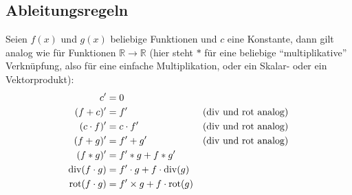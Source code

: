 \subsection{Ableitungsregeln}
Seien $f(x)$ und $g(x)$ beliebige Funktionen und $c$ eine Konstante, dann gilt analog wie für Funktionen $\mathbb{R} \to \mathbb{R}$ (hier steht $*$ für eine beliebige \enquote{multiplikative} Verknüpfung, also für eine einfache Multiplikation, oder ein Skalar- oder ein Vektorprodukt):
\begin{align*}
	c'               & = 0                             &  \\
	(f+c)'           & = f'                            & \hbox{($\operatorname{div}$ und $\operatorname{rot}$ analog)} \\
	(c\cdot f)'      & = c\cdot f'                     & \hbox{($\operatorname{div}$ und $\operatorname{rot}$ analog)} \\
	(f+g)'           & = f' + g'                       & \hbox{($\operatorname{div}$ und $\operatorname{rot}$ analog)} \\
	(f*g)'           & = f'*g + f*g'                   &  \\
	\operatorname{div}(f \cdot g) & = f' \cdot g + f \cdot \operatorname{div}(g) &  \\
	\operatorname{rot}(f\cdot g)   & = f' \times g + f\cdot\operatorname{rot}(g)   &
\end{align*}

